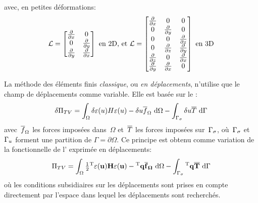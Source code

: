 avec, en petites déformations:
\begin{equation}
  \MM{\cL} = \MM*{
          \tfrac{\partial}{\partial x} & 0\\
          0 & \tfrac{\partial}{\partial y}\\
          \tfrac{\partial}{\partial y} &
          \tfrac{\partial}{\partial x}
      }
  \text{ en 2D, et }
  \MM{\cL} = \MM*{
          \tfrac{\partial}{\partial x} & 0 & 0\\
          0 & \tfrac{\partial}{\partial y} & 0\\
          0 & 0 & \tfrac{\partial}{\partial z}\\
          0 & \tfrac{\partial}{\partial z} &
          \tfrac{\partial}{\partial y}\\
          \tfrac{\partial}{\partial z} & 0&
          \tfrac{\partial}{\partial x} \\
          \tfrac{\partial}{\partial y} &
          \tfrac{\partial}{\partial x} &0\\
      }
  \text{ en 3D}
\end{equation}

\medskip
La méthode des éléments finis \emph{classique}, ou \emph{en déplacements}, n'utilise que le champ de déplacements comme variable. Elle est basée sur le :
\begin{equation}
  \label{Eq:deltaPiTV}
  \delta\Pi_{TV} = \displaystyle\int_{\Omega} \delta\varepsilon(u)H\varepsilon(u)
      - \delta u\overline{f}_{\Omega} \ \text{d}\Omega
      -\displaystyle\int_{\Gamma_\sigma} \delta u\overline{T} \ \text{d}\Gamma
\end{equation}
avec~$\overline{f}_{\Omega}$ les forces imposées dans~$\Omega$ et~$\overline{T}$ les forces imposées sur~$\Gamma_\sigma$, où~$\Gamma_\sigma$ et~$\Gamma_u$ forment une partition de $\Gamma=\partial\Omega$.
Ce principe est obtenu comme variation de la fonctionnelle de l' exprimée en déplacements:
\begin{equation}
  \label{Eq:PiTV}
  \Pi_{TV} = \dint_{\Omega} \tfrac12 \LL{\varepsilon(u)}\MM{H}\VV{\varepsilon(u)}
      - \LL{q}\VV{\fbar} \ \dd\Omega
      -\dint_{\ls} \LL{q}\VV{\Tbar} \ \dd\Gamma
\end{equation}
où les conditions subsidiaires sur les déplacements sont prises en compte directement par l'espace dans lequel les déplacements sont recherchés.

